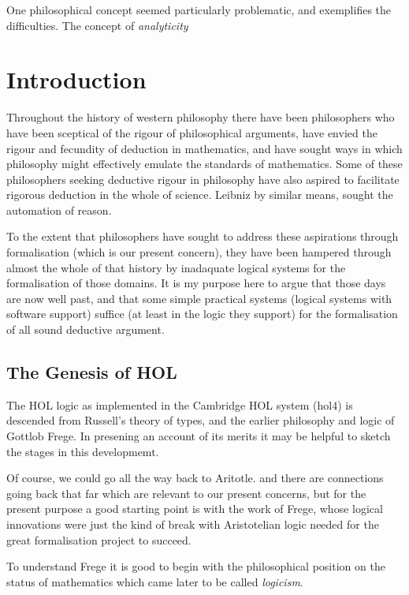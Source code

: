 \documentclass[10pt,titlepage]{book}
\begin{document}
One philosophical concept seemed particularly problematic, and exemplifies the difficulties.
The concept of {\it analyticity}


\chapter{Introduction}

Throughout the history of western philosophy there have been philosophers who have been sceptical of the rigour of philosophical arguments, have envied the rigour and fecundity of deduction in mathematics, and have sought ways in which philosophy might effectively emulate the standards of mathematics.
Some of these philosophers seeking deductive rigour in philosophy have also aspired to facilitate rigorous deduction in the whole of science.
Leibniz by similar means, sought the automation of reason.

To the extent that philosophers have sought to address these aspirations through formalisation (which is our present concern), they have been hampered through almost the whole of that history by inadaquate logical systems for the formalisation of those domains.
It is my purpose here to argue that those days are now well past, and that some simple practical systems (logical systems with software support) suffice (at least in the logic they support) for the formalisation of all sound deductive argument.

\section{The Genesis of HOL}

The HOL logic as implemented in the Cambridge HOL system (hol4) is descended from Russell's theory of types, and the earlier philosophy and logic of Gottlob Frege.
In presening an account of its merits it may be helpful to sketch the stages in this developmemt.

Of course, we could go all the way back to Aritotle. and there are connections going back that far which are relevant to our present concerns, but for the present purpose a good starting point is with the work of Frege, whose logical innovations were just the kind of break with Aristotelian logic needed for the great formalisation project to succeed.

To understand Frege it is good to begin with the philosophical position on the status of mathematics which came later to be called {\it logicism}.
\end{document}
